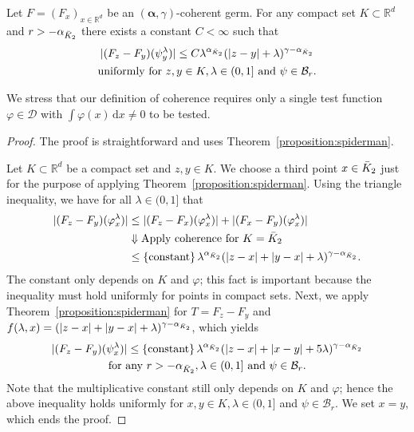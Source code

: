 \begin{theorem}
  Let \( F = (F_x)_{x \in \mathbb{R}^d} \) be an \( (\bm{\alpha}, \gamma) \)-coherent germ. For any compact set \( K \subset \mathbb{R}^d \) and \( r > - \alpha_{\bar{K}_{2}} \) there exists a constant \( C < \infty \) such that
  \begin{gather*}
    |(F_z - F_y)(\psi^\lambda_y)| \leq C \lambda^{\alpha_{\bar{K}_{2}}} (|z - y| + \lambda)^{\gamma - \alpha_{\bar{K}_{2}}}\\
    \text{uniformly for \( z,y \in K, \lambda \in (0,1] \) and \( \psi \in \mathcal{B}_r \).}
  \end{gather*}
\end{theorem}

We stress that our definition of coherence requires only a single test function \( \varphi \in \mathcal{D} \) with \( \int \varphi(x) \, \mathrm{d}x  \neq 0\) to be tested.

\begin{proof}
  The proof is straightforward and uses Theorem~\ref{proposition:spiderman}.

  Let \( K \subset \mathbb{R}^d \) be a compact set and \( z,y \in K \). We choose a third point \( x \in \bar{K}_{2} \) just for the purpose of applying Theorem~\ref{proposition:spiderman}. Using the triangle inequality, we have for all \( \lambda \in (0,1] \) that
  \begin{align*}
    |(F_z - F_y)(\varphi^\lambda_x)| &\leq |(F_z - F_x)(\varphi^\lambda_x)|  + |(F_x - F_y)(\varphi^\lambda_x)| \\
    &\Downarrow \text{Apply coherence for \( K = \bar{K}_{2} \)} \\
    &\leq \left\{ \mathrm{constant} \right\} \lambda^{\alpha_{\bar{K}_{2}}}(|z - x| + |y - x| + \lambda)^{\gamma - \alpha_{\bar{K}_{2}}}.
  \end{align*}
  The constant only depends on \( K \) and \( \varphi \); this fact is important because the inequality must hold uniformly for points in compact sets. Next, we apply Theorem~\ref{proposition:spiderman} for \( T = F_z - F_y \) and \( f(\lambda, x) = (|z - x| + |y-x| + \lambda)^{\gamma - \alpha_{\bar{K}_{2}}} \), which yields 
  \begin{gather*}
    |(F_z - F_y)(\psi^\lambda_x)| \leq \left\{ \mathrm{constant} \right\} \lambda^{\alpha_{\bar{K}_{2}}}(|z - x| + |x-y| + 5\lambda)^{\gamma - \alpha_{\bar{K}_{2}}} \\
    \text{for any \( r > -\alpha_{\bar{K}_{2}}, \lambda \in (0,1] \) and \( \psi \in \mathcal{B}_r \)}.
  \end{gather*}
  Note that the multiplicative constant still only depends on \( K \) and \( \varphi \); hence the above inequality holds uniformly for \( x,y \in K, \lambda \in (0,1] \) and \( \psi \in \mathcal{B}_r \). We set \( x = y \), which ends the proof.
\end{proof}

